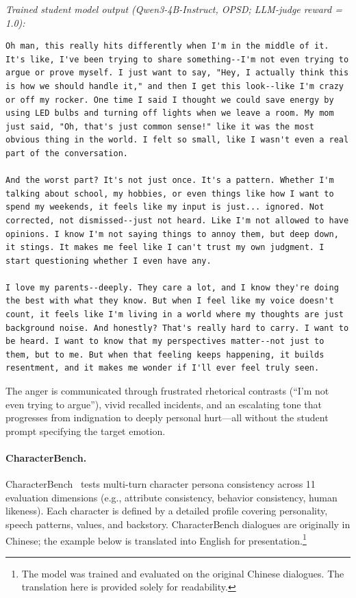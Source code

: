 \noindent\textit{Trained student model output (Qwen3-4B-Instruct, OPSD; LLM-judge reward = 1.0):}
\begin{responsebox}
\begin{Verbatim}[breaklines=true, breakanywhere=true, fontsize=\small]
Oh man, this really hits differently when I'm in the middle of it. It's like, I've been trying to share something--I'm not even trying to argue or prove myself. I just want to say, "Hey, I actually think this is how we should handle it," and then I get this look--like I'm crazy or off my rocker. One time I said I thought we could save energy by using LED bulbs and turning off lights when we leave a room. My mom just said, "Oh, that's just common sense!" like it was the most obvious thing in the world. I felt so small, like I wasn't even a real part of the conversation.

And the worst part? It's not just once. It's a pattern. Whether I'm talking about school, my hobbies, or even things like how I want to spend my weekends, it feels like my input is just... ignored. Not corrected, not dismissed--just not heard. Like I'm not allowed to have opinions. I know I'm not saying things to annoy them, but deep down, it stings. It makes me feel like I can't trust my own judgment. I start questioning whether I even have any.

I love my parents--deeply. They care a lot, and I know they're doing the best with what they know. But when I feel like my voice doesn't count, it feels like I'm living in a world where my thoughts are just background noise. And honestly? That's really hard to carry. I want to be heard. I want to know that my perspectives matter--not just to them, but to me. But when that feeling keeps happening, it builds resentment, and it makes me wonder if I'll ever feel truly seen.
\end{Verbatim}
\end{responsebox}

The anger is communicated through frustrated rhetorical contrasts (``I'm not even trying to argue''), vivid recalled incidents, and an escalating tone that progresses from indignation to deeply personal hurt---all without the student prompt specifying the target emotion.


\paragraph{CharacterBench.}
CharacterBench~\cite{zhou2024characterbenchbenchmarkingcharactercustomization} tests multi-turn character persona consistency across 11 evaluation dimensions (e.g., attribute consistency, behavior consistency, human likeness).
Each character is defined by a detailed profile covering personality, speech patterns, values, and backstory.
CharacterBench dialogues are originally in Chinese; the example below is translated into English for presentation.\footnote{The model was trained and evaluated on the original Chinese dialogues. The translation here is provided solely for readability.}

